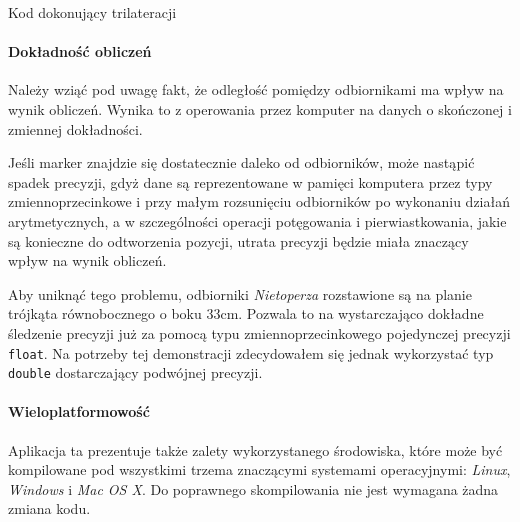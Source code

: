 \begin{listing}
  
  \caption{Kod dokonujący trilateracji}
  \label{lst:trilateration}
\end{listing}

\paragraph{Dokładność obliczeń}
Należy wziąć pod uwagę fakt, że odległość pomiędzy odbiornikami ma wpływ na wynik obliczeń. Wynika to z operowania przez komputer na danych o skończonej i zmiennej dokładności.

Jeśli marker znajdzie się dostatecznie daleko od odbiorników, może nastąpić spadek precyzji, gdyż dane są reprezentowane w pamięci komputera przez typy zmiennoprzecinkowe i przy małym rozsunięciu odbiorników po wykonaniu działań arytmetycznych, a w szczególności operacji potęgowania i pierwiastkowania, jakie są konieczne do odtworzenia pozycji, utrata precyzji będzie miała znaczący wpływ na wynik obliczeń.

Aby uniknąć tego problemu, odbiorniki \textsl{Nietoperza} rozstawione są na planie trójkąta równobocznego o boku 33cm. Pozwala to na wystarczająco dokładne śledzenie precyzji już za pomocą typu zmiennoprzecinkowego pojedynczej precyzji \verb|float|. Na potrzeby tej demonstracji zdecydowałem się jednak wykorzystać typ \verb|double| dostarczający podwójnej precyzji.

\paragraph{Wieloplatformowość}
Aplikacja ta prezentuje także zalety wykorzystanego środowiska, które może być kompilowane pod wszystkimi trzema znaczącymi systemami operacyjnymi: \textsl{Linux}, \textsl{Windows} i \textsl{Mac OS X}. Do poprawnego skompilowania nie jest wymagana żadna zmiana kodu.

